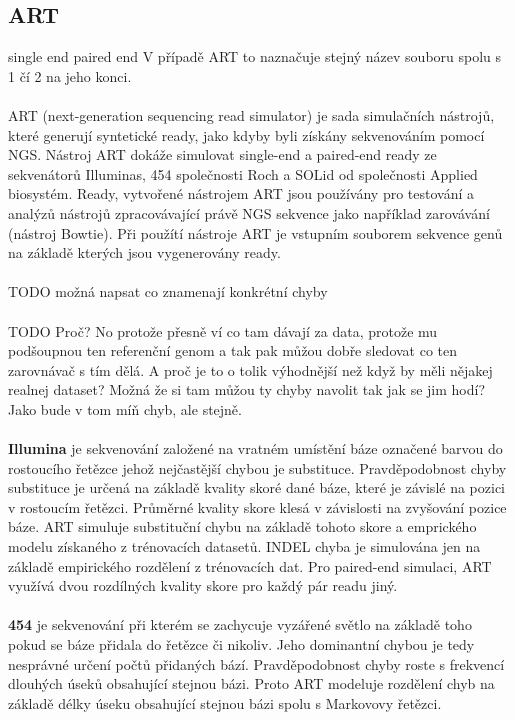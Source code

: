 \documentclass[czech,DP]{thesiskiv}
\numberwithin{equation}{section}
\begin{document}
\subsection{ART}
single end paired end
V případě ART to naznačuje stejný název souboru spolu s 1 čí 2 na jeho konci.
\\
\\
ART (next-generation sequencing read simulator) je sada simulačních nástrojů, které generují syntetické ready, jako kdyby byli získány sekvenováním pomocí NGS. Nástroj ART dokáže simulovat single-end a paired-end ready ze sekvenátorů Illuminas, 454 společnosti Roch a SOLid od společnosti Applied biosystém. Ready, vytvořené nástrojem ART jsou používány pro testování a analýzů nástrojů zpracovávající právě NGS sekvence jako například zarovávání (nástroj Bowtie). Při použítí nástroje ART je vstupním souborem sekvence genů na základě kterých jsou vygenerovány ready. \cite{art}
\\
\\
TODO možná napsat co znamenají konkrétní chyby
\\
\\
TODO
Proč? No protože přesně ví co tam dávají za data, protože mu podšoupnou ten referenční genom a tak pak můžou dobře sledovat co ten zarovnávač s tím dělá. 
A proč je to o tolik výhodnější než když by měli nějakej realnej dataset? 
Možná že si tam můžou ty chyby navolit tak jak se jim hodí?
Jako bude v tom míň chyb, ale stejně.
\\
\\
\textbf{Illumina} je sekvenování založené na vratném umístění báze označené barvou do rostoucího řetězce jehož nejčastější chybou je substituce. Pravděpodobnost chyby substituce je určená na základě kvality skoré dané báze, které je závislé na pozici v rostoucím řetězci. Průměrné kvality skore klesá v závislosti na zvyšování pozice báze. ART simuluje substituční chybu na základě tohoto skore a emprického modelu získaného z trénovacích datasetů. INDEL chyba je simulována jen na základě empirického rozdělení z trénovacích dat. Pro paired-end simulaci, ART využívá dvou rozdílných kvality skore pro každý pár readu jiný. 
\\
\\
\textbf{454} je sekvenování při kterém se zachycuje vyzářené světlo na základě toho pokud se báze přidala do řetězce či nikoliv. Jeho dominantní chybou je tedy nesprávné určení počtů přidaných bází. Pravděpodobnost chyby roste s frekvencí dlouhých úseků obsahující stejnou bázi. Proto ART modeluje rozdělení chyb na základě délky úseku obsahující stejnou bázi spolu s Markovovy řetězci.
\end{document}

